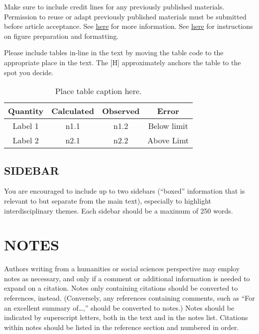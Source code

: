 \documentclass[12pt]{article}
\begin{document}
Make sure to include credit lines for any previously published materials. Permission to reuse or adapt previously published materials must be submitted before article acceptance. See \href{http://wires.wiley.com/WileyCDA/Section/id-398153.html#Resources}{here} for more information. See \href{http://media.wiley.com/assets/7315/44/Figure_preparation.pdf}{here} for instructions on figure preparation and formatting.

Please include tables in-line in the text by moving the table code to the appropriate place in the text. The [H] approximately anchors the table to the spot you decide.
\begin{table}[H]
	\centering
	\begin{tabular}{|c|c|c|c|}\hline
		\textbf{Quantity} & \textbf{Calculated} & \textbf{Observed} & \textbf{Error} \\ \hline
		Label 1 & n1.1 & n1.2 & Below limit \\ \hline
		Label 2 & n2.1 & n2.2 & Above Limt \\ \hline
	\end{tabular}
	\caption{\label{tbl1} Place table caption here.}
\end{table}






\subsection*{\sffamily \large SIDEBAR}

You are encouraged to include up to two sidebars (“boxed” information that is relevant to but separate from the main text), especially to highlight interdisciplinary themes. Each sidebar should be a maximum of 250 words.

\section*{\sffamily \Large NOTES}
Authors writing from a humanities or social sciences perspective may employ notes as necessary, and only if a comment or additional information is needed to expand on a citation. Notes only containing citations should be converted to references, instead. (Conversely, any references containing comments, such as “For an excellent summary of…,” should be converted to notes.) Notes should be indicated by superscript letters, both in the text and in the notes list. Citations within notes should be listed in the reference section and numbered in order.
\end{document}
